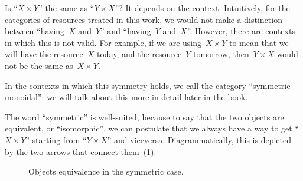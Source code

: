 Is ``$X \times Y$'' the same as ``$Y \times X$''?
It depends on the context.
Intuitively, for the categories of resources treated in this work, we would not make a distinction between ``having~$X$ and~$Y$'' and ``having~$Y$ and~$X$''.
However, there are contexts in which this is not valid.
For example, if we are using~$X \times Y$ to mean that we will have the resource~$X$ today, and the resource~$Y$ tomorrow, then~$Y \times X$ would not be the same as~$X \times Y$.

In the contexts in which this symmetry holds, we call the category ``symmetric monoidal'': we will talk about this more in detail later in the book.

The word ``symmetric'' is well-suited, because to say that the two objects are equivalent, or ``isomorphic'', we can postulate that we always have a way to get
``$X \times Y$'' starting from ``$Y \times X$'' and viceversa.
Diagrammatically, this is depicted by the two arrows that connect them~(\cref{fig:e17}).

\begin{figure}[h!]
	\centering
	\caption{Objects equivalence in the symmetric case. }
	\label{fig:e17}
\end{figure}

